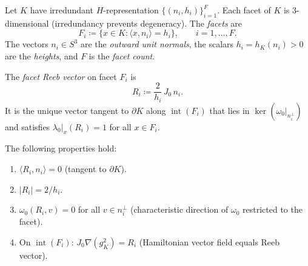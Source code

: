 \begin{definition}\label{def:facets}
Let $K$ have irredundant $H$-representation
$\{(n_i, h_i)\}_{i=1}^{F}$.
Each facet of $K$ is $3$-dimensional (irredundancy prevents degeneracy).
The \emph{facets} are
\[
  F_i \coloneqq \{ x \in K : \langle x, n_i \rangle = h_i \},
  \qquad i = 1, \ldots, F.
\]
The vectors $n_i \in S^3$ are the \emph{outward unit normals},
the scalars $h_i = h_K(n_i) > 0$ are the \emph{heights},
and $F$ is the \emph{facet count}.
\end{definition}

\begin{definition}\label{def:reeb-vectors}
The \emph{facet Reeb vector} on facet $F_i$ is
\[
  R_i \coloneqq \frac{2}{h_i}\, J_0\, n_i.
\]
It is the unique vector tangent to $\partial K$ along
$\operatorname{int}(F_i)$ that lies in
$\ker(\omega_0|_{n_i^\perp})$ and satisfies
$\lambda_0|_x(R_i) = 1$ for all $x \in F_i$.
\end{definition}

\begin{remark}\label{rem:reeb-properties}
The following properties hold:
\begin{enumerate}
\item $\langle R_i, n_i \rangle = 0$ (tangent to $\partial K$).
\item $|R_i| = 2/h_i$.
\item $\omega_0(R_i, v) = 0$ for all $v \in n_i^\perp$
  (characteristic direction of $\omega_0$ restricted to the facet).
\item On $\operatorname{int}(F_i)$: $J_0 \nabla(g_K^2) = R_i$
  (Hamiltonian vector field equals Reeb vector).
\end{enumerate}
\end{remark}

